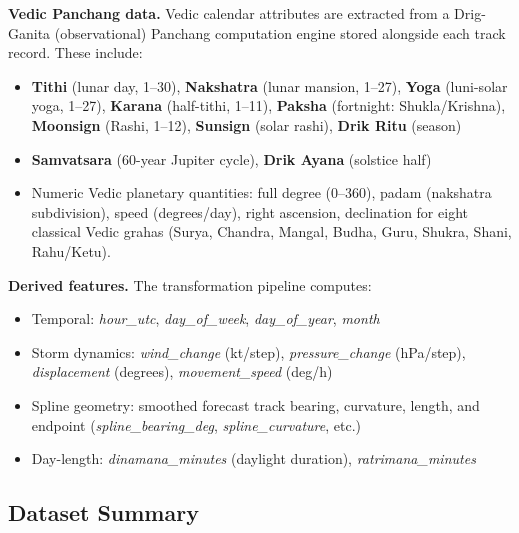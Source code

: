 \documentclass[12pt,a4paper]{article}
\begin{document}
\textbf{Vedic Panchang data.} Vedic calendar attributes are extracted from a
Drig-Ganita (observational) Panchang computation engine stored alongside each
track record. These include:
\begin{itemize}
  \item \textbf{Tithi} (lunar day, 1--30), \textbf{Nakshatra} (lunar mansion, 1--27),
        \textbf{Yoga} (luni-solar yoga, 1--27), \textbf{Karana} (half-tithi, 1--11),
        \textbf{Paksha} (fortnight: Shukla/Krishna), \textbf{Moonsign} (Rashi, 1--12),
        \textbf{Sunsign} (solar rashi), \textbf{Drik Ritu} (season)
  \item \textbf{Samvatsara} (60-year Jupiter cycle), \textbf{Drik Ayana} (solstice half)
  \item Numeric Vedic planetary quantities: full degree (0--360\textdegree),
        padam (nakshatra subdivision), speed (degrees/day), right ascension, declination
        for eight classical Vedic grahas (Surya, Chandra, Mangal, Budha, Guru, Shukra,
        Shani, Rahu/Ketu).
\end{itemize}

\textbf{Derived features.} The transformation pipeline computes:
\begin{itemize}
  \item Temporal: \textit{hour\_utc}, \textit{day\_of\_week}, \textit{day\_of\_year}, \textit{month}
  \item Storm dynamics: \textit{wind\_change} (kt/step), \textit{pressure\_change} (hPa/step),
        \textit{displacement} (degrees), \textit{movement\_speed} (deg/h)
  \item Spline geometry: smoothed forecast track bearing, curvature, length, and endpoint
        (\textit{spline\_bearing\_deg}, \textit{spline\_curvature}, etc.)
  \item Day-length: \textit{dinamana\_minutes} (daylight duration), \textit{ratrimana\_minutes}
\end{itemize}

\subsection{Dataset Summary}
\end{document}
